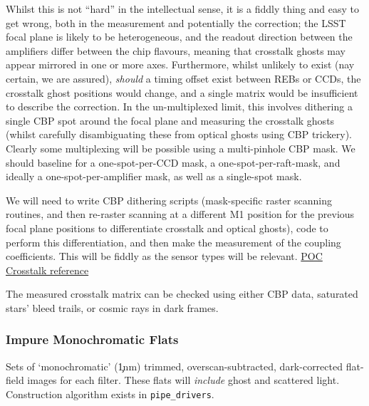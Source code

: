  Whilst this is not ``hard'' in the intellectual sense, it is a fiddly thing and easy to get wrong, both in the measurement and potentially the correction; the LSST focal plane is likely to be heterogeneous, and the readout direction between the amplifiers differ between the chip flavours, meaning that crosstalk ghosts may appear mirrored in one or more axes. Furthermore, whilst unlikely to exist (nay certain, we are assured), \emph{should} a timing offset exist between REBs or CCDs, the crosstalk ghost positions would change, and a single matrix would be insufficient to describe the correction.
\alg In the un-multiplexed limit, this involves dithering a single CBP spot around the focal plane and measuring the crosstalk ghosts (whilst carefully disambiguating these from optical ghosts using CBP trickery). Clearly some multiplexing will be possible using a multi-pinhole CBP mask. We should baseline for a one-spot-per-CCD mask, a one-spot-per-raft-mask, and ideally a one-spot-per-amplifier mask, as well as a single-spot mask.

 We will need to write CBP dithering scripts (mask-specific raster scanning routines, and then re-raster scanning at a different M1 position for the previous focal plane positions to differentiate crosstalk and optical ghosts), code to perform this differentiation, and then make the measurement of the coupling coefficients. This will be fiddly as the sensor types will be relevant. \hyperref{http://iopscience.iop.org/article/10.1088/1748-0221/10/05/C05010}{}{}{POC Crosstalk reference} 

The measured crosstalk matrix can be checked using either CBP data, saturated stars' bleed trails, or cosmic rays in dark frames.



\subsubsection{Impure Monochromatic Flats}\label{sec:CPP:output:monoFlat}
Sets of `monochromatic' (\c 1nm) trimmed, overscan-subtracted, dark-corrected flat-field images for each filter. These flats will \emph{include} ghost and scattered light.
\alg Construction algorithm exists in \texttt{pipe\_drivers}.


